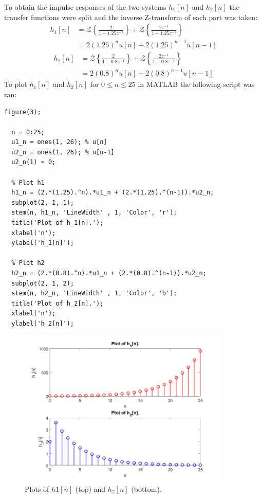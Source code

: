 \documentclass[a4paper, 10pt]{article}
\begin{document}
\noindent To obtain the impulse responses of the two systems $h_1[n]$ and $h_2[n]$ the transfer functions
were split and the inverse Z-transform of each part was taken:
\begin{equation}
  \begin{aligned}
    h_1[n] & = \mathcal{Z}\left\{\frac {2} {1-1.25z^{-1}}\right\} + \mathcal{Z}\left\{\frac {2z^{-1}} {1-1.25z^{-1}}\right\} \\
           & = 2(1.25)^nu[n]+2(1.25)^{n-1}u[n-1]
  \end{aligned}
\end{equation}
\begin{equation}
  \begin{aligned}
    h_1[n] & = \mathcal{Z}\left\{\frac {2} {1-0.8z^{-1}}\right\} + \mathcal{Z}\left\{\frac {2z^{-1}} {1-0.8z^{-1}}\right\} \\
           & = 2(0.8)^nu[n]+2(0.8)^{n-1}u[n-1]
  \end{aligned}
\end{equation}
To plot $h_1[n]$ and $h_2[n]$ for $0\leq n\leq 25$ in MATLAB the following script was ran:
\begin{lstlisting}[style=Matlab-editor, basicstyle=\small\ttfamily]
  figure(3);

  n = 0:25;
  u1_n = ones(1, 26); % u[n]
  u2_n = ones(1, 26); % u[n-1]
  u2_n(1) = 0;

  % Plot h1
  h1_n = (2.*(1.25).^n).*u1_n + (2.*(1.25).^(n-1)).*u2_n;
  subplot(2, 1, 1);
  stem(n, h1_n, 'LineWidth' , 1, 'Color', 'r');
  title('Plot of h_1[n].');
  xlabel('n');
  ylabel('h_1[n]');

  % Plot h2
  h2_n = (2.*(0.8).^n).*u1_n + (2.*(0.8).^(n-1)).*u2_n;
  subplot(2, 1, 2);
  stem(n, h2_n, 'LineWidth' , 1, 'Color', 'b');
  title('Plot of h_2[n].');
  xlabel('n');
  ylabel('h_2[n]');
\end{lstlisting}
\begin{figure}[H]
  \centering
  \includegraphics[width=10cm]{images/q2_c.png}
  \caption{Plots of $h1[n]$ (top) and $h_2[n]$ (bottom).}
\end{figure}
\end{document}
